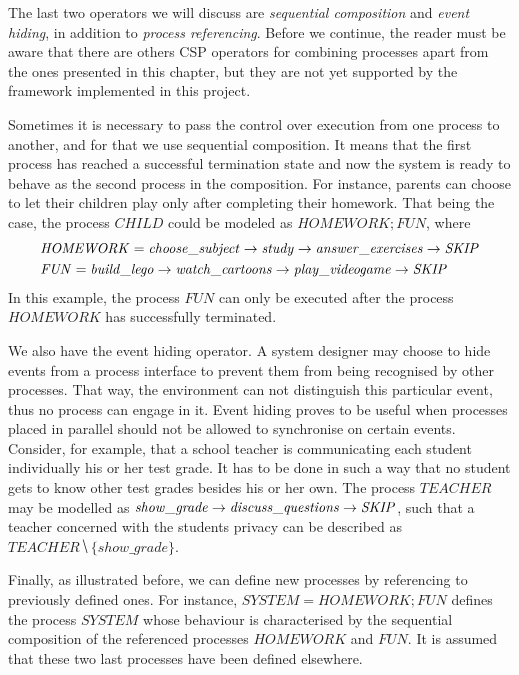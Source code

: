 The last two operators we will discuss are \emph{sequential composition} and \emph{event hiding}, in addition to \emph{process referencing}. Before we continue, the reader must be aware that there are others CSP operators for combining processes apart from the ones presented in this chapter, but they are not yet supported by the framework implemented in this project.

Sometimes it is necessary to pass the control over execution from one process to another, and for that we use sequential composition. It means that the first process has reached a successful termination state and now the system is ready to behave as the second process in the composition. For instance, parents can choose to let their children play only after completing their homework. That being the case, the process $ \mathit{CHILD} $ could be modeled as $ \mathit{HOMEWORK}\!; \mathit{FUN} $, where
\begin{align}
	&\mathit{HOMEWORK} = \mathit{choose\_subject} \mathrel{\rightarrow} \mathit{study} \mathrel{\rightarrow} \mathit{answer\_exercises} \mathrel{\rightarrow} \mathit{\mathord{{SKIP}}} \notag \\
	&\mathit{FUN} = \mathit{build\_lego} \mathrel{\rightarrow} \mathit{watch\_cartoons} \mathrel{\rightarrow} \mathit{play\_videogame} \mathrel{\rightarrow} \mathit{\mathord{{SKIP}}} \notag
\end{align}
In this example, the process $ \mathit{FUN} $ can only be executed after the process $ \mathit{HOMEWORK} $ has successfully terminated.

We also have the event hiding operator. A system designer may choose to hide events from a process interface to prevent them from being recognised by other processes. That way, the environment can not distinguish this particular event, thus no process can engage in it. Event hiding proves to be useful when processes placed in parallel should not be allowed to synchronise on certain events. Consider, for example, that a school teacher is communicating each student individually his or her test grade. It has to be done in such a way that no student gets to know other test grades besides his or her own. The process $ \mathit{TEACHER} $ may be modelled as $ \mathit{show\_grade} \mathrel{\rightarrow} \mathit{discuss\_questions} \mathrel{\rightarrow} \mathit{\mathord{{SKIP}}} $, such that a teacher concerned with the students privacy can be described as $ \mathit{TEACHER} \hide \{show\_grade\} $.

Finally, as illustrated before, we can define new processes by referencing to previously defined ones. For instance, $\mathit{SYSTEM} = \mathit{HOMEWORK}\!; \mathit{FUN} $ defines the process $\mathit{SYSTEM}$ whose behaviour is characterised by the sequential composition of the referenced processes $\mathit{HOMEWORK}$ and $\mathit{FUN}$. It is assumed that these two last processes have been defined elsewhere.

